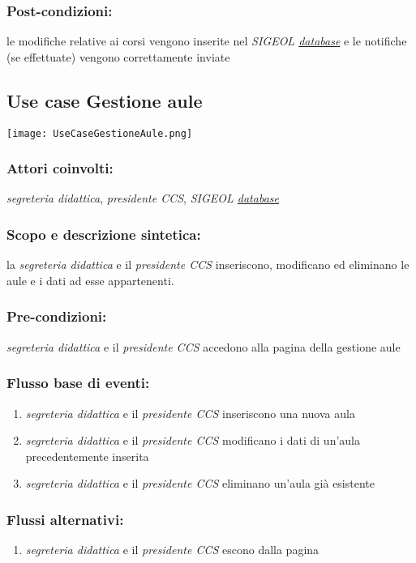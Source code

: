 \documentclass[11pt,a4paper]{article}
\begin{document}
\subsubsection*{Post-condizioni:}
le modifiche relative ai corsi vengono inserite nel \textit{SIGEOL \underline{database}} e le notifiche (se effettuate) vengono correttamente 
inviate

\subsection{Use case Gestione aule}
\texttt{[image: UseCaseGestioneAule.png]}
\subsubsection*{Attori coinvolti:}
\textit{segreteria didattica}, \textit{presidente CCS}, \textit{SIGEOL \underline{database}}
\subsubsection*{Scopo e descrizione sintetica:}
la \textit{segreteria didattica} e il \textit{presidente CCS} inseriscono, modificano ed eliminano le aule e i dati ad esse appartenenti.
\subsubsection*{Pre-condizioni:}
\textit{segreteria didattica} e il \textit{presidente CCS} accedono alla pagina della gestione aule
\subsubsection*{Flusso base di eventi:}
\begin{enumerate}
 \item \textit{segreteria didattica} e il \textit{presidente CCS} inseriscono una nuova aula
 \item \textit{segreteria didattica} e il \textit{presidente CCS} modificano i dati di un'aula precedentemente inserita
 \item \textit{segreteria didattica} e il \textit{presidente CCS} eliminano un'aula già esistente
\end{enumerate}
\subsubsection*{Flussi alternativi:}
\begin{enumerate} 
\item \textit{segreteria didattica} e il \textit{presidente CCS} escono dalla pagina
\end{enumerate}
\end{document}
